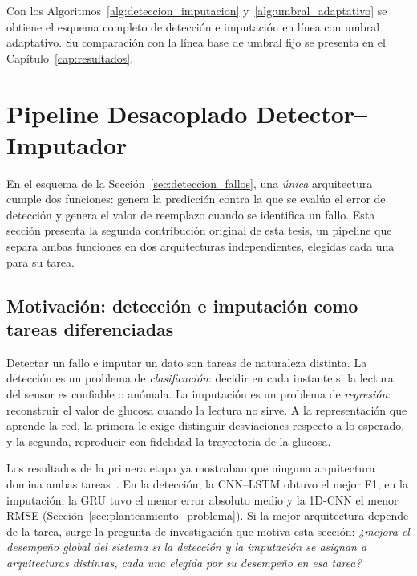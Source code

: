\documentclass{report}
\begin{document}
Con los Algoritmos~\ref{alg:deteccion_imputacion} y~\ref{alg:umbral_adaptativo} se obtiene el esquema completo de detección e imputación en línea con umbral adaptativo. Su comparación con la línea base de umbral fijo se presenta en el Capítulo~\ref{cap:resultados}.

\section{Pipeline Desacoplado Detector--Imputador}
\label{sec:pipeline_desacoplado}

En el esquema de la Sección~\ref{sec:deteccion_fallos}, una \textit{única} arquitectura cumple dos funciones: genera la predicción contra la que se evalúa el error de detección y genera el valor de reemplazo cuando se identifica un fallo. Esta sección presenta la segunda contribución original de esta tesis, un pipeline que separa ambas funciones en dos arquitecturas independientes, elegidas cada una para su tarea.

\subsection{Motivación: detección e imputación como tareas diferenciadas}
\label{subsec:motivacion_pipeline}

Detectar un fallo e imputar un dato son tareas de naturaleza distinta. La detección es un problema de \textit{clasificación}: decidir en cada instante si la lectura del sensor es confiable o anómala. La imputación es un problema de \textit{regresión}: reconstruir el valor de glucosa cuando la lectura no sirve. A la representación que aprende la red, la primera le exige distinguir desviaciones respecto a lo esperado, y la segunda, reproducir con fidelidad la trayectoria de la glucosa.

Los resultados de la primera etapa ya mostraban que ninguna arquitectura domina ambas tareas~\cite{sanchez2025imputation}. En la detección, la CNN--LSTM obtuvo el mejor F1; en la imputación, la GRU tuvo el menor error absoluto medio y la 1D-CNN el menor RMSE (Sección~\ref{sec:planteamiento_problema}). Si la mejor arquitectura depende de la tarea, surge la pregunta de investigación que motiva esta sección: \textit{¿mejora el desempeño global del sistema si la detección y la imputación se asignan a arquitecturas distintas, cada una elegida por su desempeño en esa tarea?}
\end{document}
